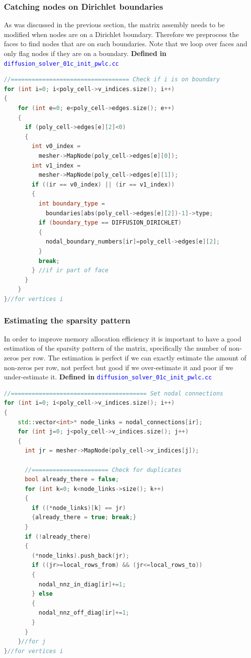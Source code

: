 \documentclass[11pt,letterpaper,titlepage]{article}
\newcommand{\xmltag}[1]{\textcolor{blue}{ \texttt{#1}} }
\numberwithin{equation}{section}
\begin{document}
\subsubsection{Catching nodes on Dirichlet boundaries}
As was discussed in the previous section, the matrix assembly needs to be modified when nodes are on a Dirichlet boundary. Therefore we preprocess the faces to find nodes that are on such boundaries. Note that we loop over faces and only flag nodes if they are on a boundary.
\newline
\newline
\textbf{Defined in }\xmltag{diffusion\_solver\_01c\_init\_pwlc.cc}
\begin{lstlisting}[language=c++]
//================================== Check if i is on boundary
for (int i=0; i<poly_cell->v_indices.size(); i++)
{
	for (int e=0; e<poly_cell->edges.size(); e++)
	{
	  if (poly_cell->edges[e][2]<0)
	  {
	    int v0_index =
	      mesher->MapNode(poly_cell->edges[e][0]);
	    int v1_index =
	      mesher->MapNode(poly_cell->edges[e][1]);
	    if ((ir == v0_index) || (ir == v1_index))
	    {
	      int boundary_type =
	        boundaries[abs(poly_cell->edges[e][2])-1]->type;
	      if (boundary_type == DIFFUSION_DIRICHLET)
	      {
	        nodal_boundary_numbers[ir]=poly_cell->edges[e][2];
	      }
	      break;
	    } //if ir part of face
	  }
	}
}//for vertices i
\end{lstlisting}

\subsubsection{Estimating the sparsity pattern}
In order to improve memory allocation efficiency it is important to have a good estimation of the sparsity pattern of the matrix, specifically the number of non-zeros per row. The estimation is perfect if we can exactly estimate the amount of non-zeros per row, not perfect but good if we over-estimate it and poor if we under-estimate it.
\newline
\newline
\textbf{Defined in }\xmltag{diffusion\_solver\_01c\_init\_pwlc.cc}
\begin{lstlisting}[language=c++]
//======================================= Set nodal connections
for (int i=0; i<poly_cell->v_indices.size(); i++)
{
	std::vector<int>* node_links = nodal_connections[ir];
	for (int j=0; j<poly_cell->v_indices.size(); j++)
	{
	  int jr = mesher->MapNode(poly_cell->v_indices[j]);
	
	  //====================== Check for duplicates
	  bool already_there = false;
	  for (int k=0; k<node_links->size(); k++)
	  {
	    if ((*node_links)[k] == jr)
	    {already_there = true; break;}
	  }
	  if (!already_there)
	  {
	    (*node_links).push_back(jr);
	    if ((jr>=local_rows_from) && (jr<=local_rows_to))
	    {
	      nodal_nnz_in_diag[ir]+=1;
	    } else
	    {
	      nodal_nnz_off_diag[ir]+=1;
	    }
	  }
	}//for j
}//for vertices i
\end{lstlisting}
\end{document}
